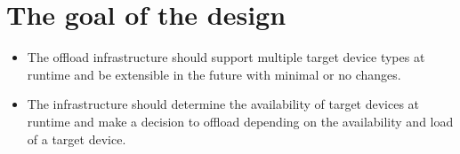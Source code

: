 \section{The goal of the design}
\begin{itemize}
  \item The offload infrastructure should support multiple target device types at runtime and be extensible in the future with minimal or no changes.

  \item The infrastructure should determine the availability of target devices at runtime and make a decision to offload depending on the availability and load of a target device.
\end{itemize}
